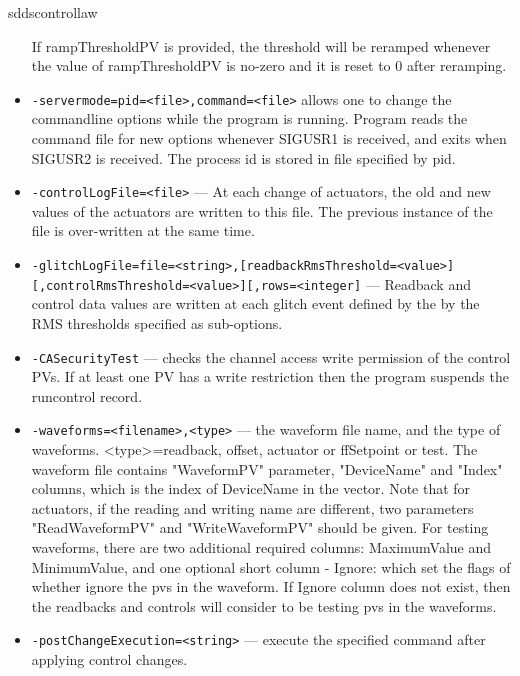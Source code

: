 \begin{sddsprog}{sddscontrollaw}
\begin{itemize}
               If rampThresholdPV is provided, the threshold will be reramped whenever 
               the value of rampThresholdPV is no-zero and it is reset to 0 after reramping.
        \item {\tt -servermode=pid=<file>,command=<file>}     allows one to change the commandline options while the program is
               running. Program reads the command file for new options whenever
               SIGUSR1 is received, and exits when SIGUSR2 is received.
               The process id is stored in file specified by pid.
        \item {\tt -controlLogFile=<file>} --- At each change of actuators, the old and new values of the actuators
               are written to this file. The previous instance of the file 
               is over-written at the same time.
        \item {\tt -glitchLogFile=file=<string>,[readbackRmsThreshold=<value>][,controlRmsThreshold=<value>][,rows=<integer]} ---
                  Readback and control data values
               are written at each glitch event defined by the
               by the RMS thresholds specified as sub-options.
        \item {\tt -CASecurityTest} --- checks the channel access write permission of the control PVs.
               If at least one PV has a write restriction then the program suspends
               the runcontrol record.
        \item {\tt -waveforms=<filename>,<type>} --- the waveform file name, and the type of
               waveforms. <type>=readback, offset, actuator or ffSetpoint or test.
               The waveform file contains "WaveformPV" parameter,
               "DeviceName" and "Index" columns, which is the index of DeviceName in
               the vector. Note that for actuators, if the reading and writing name are
               different, two parameters "ReadWaveformPV" and "WriteWaveformPV"
               should be given. For testing waveforms, there are two additional required columns:
               MaximumValue and MinimumValue, and one optional short column - Ignore:
               which set the flags of whether ignore the pvs in the waveform. If Ignore column
               does not exist, then the readbacks and controls will consider to be testing pvs
               in the waveforms.
        \item {\tt -postChangeExecution=<string>} --- execute the specified command after applying control changes.
    \end{itemize}


\end{sddsprog}
